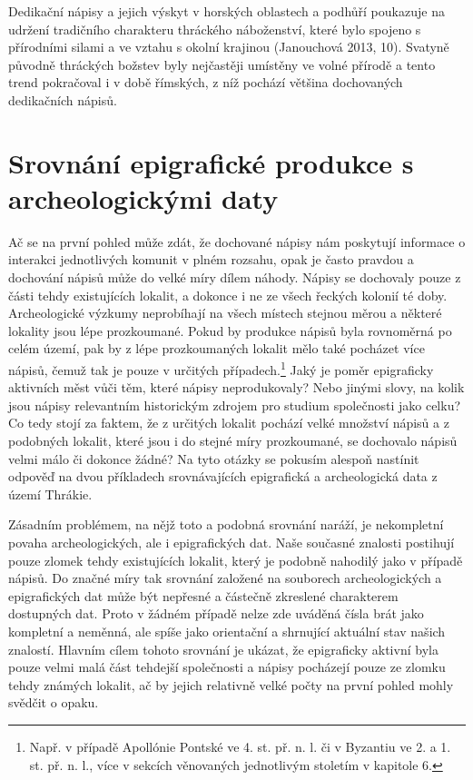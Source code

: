 Dedikační nápisy a jejich výskyt v horských oblastech a podhůří poukazuje na udržení tradičního charakteru thráckého náboženství, které bylo spojeno s přírodními silami a ve vztahu s okolní krajinou (Janouchová 2013, 10). Svatyně původně thráckých božstev byly nejčastěji umístěny ve volné přírodě a tento trend pokračoval i v době římských, z níž pochází většina dochovaných dedikačních nápisů.

\section[srovnání-epigrafické-produkce-s-archeologickými-daty]{Srovnání epigrafické produkce s archeologickými daty}

Ač se na první pohled může zdát, že dochované nápisy nám poskytují informace o interakci jednotlivých komunit v plném rozsahu, opak je často pravdou a dochování nápisů může do velké míry dílem náhody. Nápisy se dochovaly pouze z části tehdy existujících lokalit, a dokonce i ne ze všech řeckých kolonií té doby. Archeologické výzkumy neprobíhají na všech místech stejnou měrou a některé lokality jsou lépe prozkoumané. Pokud by produkce nápisů byla rovnoměrná po celém území, pak by z lépe prozkoumaných lokalit mělo také pocházet více nápisů, čemuž tak je pouze v určitých případech.\footnote{Např. v případě Apollónie Pontské ve 4. st. př. n. l. či v Byzantiu ve 2. a 1. st. př. n. l., více v sekcích věnovaných jednotlivým stoletím v kapitole 6.} Jaký je poměr epigraficky aktivních měst vůči těm, které nápisy neprodukovaly? Nebo jinými slovy, na kolik jsou nápisy relevantním historickým zdrojem pro studium společnosti jako celku? Co tedy stojí za faktem, že z určitých lokalit pochází velké množství nápisů a z podobných lokalit, které jsou i do stejné míry prozkoumané, se dochovalo nápisů velmi málo či dokonce žádné? Na tyto otázky se pokusím alespoň nastínit odpověď na dvou příkladech srovnávajících epigrafická a archeologická data z území Thrákie.

Zásadním problémem, na nějž toto a podobná srovnání naráží, je nekompletní povaha archeologických, ale i epigrafických dat. Naše současné znalosti postihují pouze zlomek tehdy existujících lokalit, který je podobně nahodilý jako v případě nápisů. Do značné míry tak srovnání založené na souborech archeologických a epigrafických dat může být nepřesné a částečně zkreslené charakterem dostupných dat. Proto v žádném případě nelze zde uváděná čísla brát jako kompletní a neměnná, ale spíše jako orientační a shrnující aktuální stav našich znalostí. Hlavním cílem tohoto srovnání je ukázat, že epigraficky aktivní byla pouze velmi malá část tehdejší společnosti a nápisy pocházejí pouze ze zlomku tehdy známých lokalit, ač by jejich relativně velké počty na první pohled mohly svědčit o opaku.


